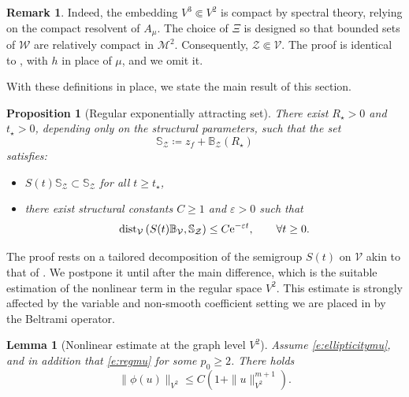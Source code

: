 \documentclass[12pt,leqno]{amsart}
\def\e{{\rm e}}
\def\dist{{\rm dist}}
\newtheorem{proposition}[theorem]{Proposition}
\newtheorem{lemma}[theorem]{Lemma}
\theoremstyle{definition}
\newtheorem{remark}[theorem]{Remark}
\numberwithin{equation}{section}
\numberwithin{figure}{section}
\begin{document}
\begin{remark}\label{rem:Z-compact} Indeed,
the embedding ${V^3}\Subset {V^2}$ is compact by spectral theory, relying on the compact resolvent of $A_\mu$.
The choice of $\Xi$ is designed so that bounded sets of $\mathcal W$ are relatively compact in
$\mathcal M^2$. Consequently,
$
\mathcal Z\Subset \mathcal V.
$
The proof is identical to \cite[Remark~7.1]{CGDP2010}, with $h$ in place of $\mu$, and we omit it.
\end{remark} With these definitions in place, we state the main result of this section.
\begin{proposition}[Regular exponentially attracting set]\label{thm:regular-exp-attract-sec7}
There exist $R_\star>0$ and $t_\star>0$, depending only on the structural parameters, such that the set
\begin{equation}\label{eq:B-def-sec7}
\mathbb S_{\mathcal Z}\coloneqq z_f+\mathbb B_{\mathcal Z}(R_\star)
\end{equation}
satisfies:
\begin{itemize}
\item[\textup{(i)}]  
$S(t) \mathbb S_{\mathcal Z}\subset \mathbb S_{\mathcal Z}$ for all $t\ge t_\star$, 
\item[\textup{(ii)}]  
there exist structural constants $C\ge1$ and $\varepsilon>0$ such that
\begin{equation}\label{eq:exp-attract-B-sec7}
\dist_{\mathcal V}\left(S(t)\mathbb B_{\mathcal V},\mathbb S_{\mathcal Z}\right)\le C\e^{-\varepsilon t},
\qquad \forall t\ge0.
\end{equation}
\end{itemize}
\end{proposition}
The proof rests on a tailored decomposition of the semigroup $ S(t)$ on $\mathcal V$ akin to that of \cite[Section 7]{CGDP2010}.  We postpone it until after the main difference, which is the suitable estimation of the nonlinear term in the regular space ${V^2}$. This estimate is strongly affected by the variable and non-smooth coefficient setting we are placed in by the Beltrami operator.  \begin{lemma}[Nonlinear estimate at the graph level ${V^2}$]\label{lem:phi-in-H2}
Assume \eqref{e:ellipticitymu}, and in addition that \eqref{e:regmu} for some $p_0\ge2$.
There holds
\begin{equation}\label{eq:phi-H2-est-subbed}
\|\phi(u)\|_{{V^2}}
\le C\left(1+\|u\|_{{V^2}}^{m+1}\right).
\end{equation}
\end{lemma}
\end{document}
